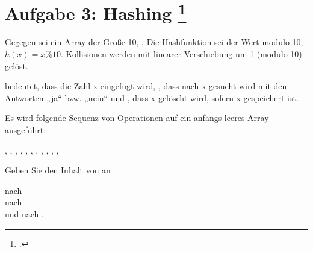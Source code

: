 \documentclass{bschlangaul-aufgabe}
\begin{document}

\section{Aufgabe 3: Hashing
\footcite[Thema 2 Aufgabe 3 Seite 4]{examen:66115:2010:09}
}

Gegegen sei ein Array der Größe 10, \zB {}. Die Hashfunktion sei der Wert modulo 10, $h(x) = x \% 10$.
Kollisionen werden mit linearer Verschiebung um 1 (modulo 10) gelöst.

 bedeutet, dass die Zahl x eingefügt wird, ,
dass nach x gesucht wird mit den Antworten „ja“ bzw. „nein“ und
, dass x gelöscht wird, sofern x gespeichert ist.

Es wird folgende Sequenz von Operationen auf ein anfangs leeres Array
ausgeführt:

,
,
,
,
,
,
,
,
,
,
,

Geben Sie den Inhalt von  an

nach \\
nach \\
und nach .
\end{document}
